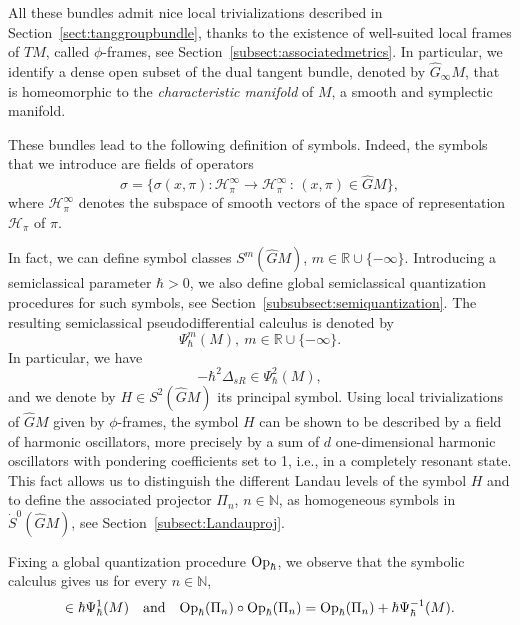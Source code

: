 \documentclass[12pt,a4paper]{amsart}
\theoremstyle{plain}
\theoremstyle{definition}
\theoremstyle{remark}
\numberwithin{equation}{section}
\theoremstyle{definition}
\def\R{{\mathbb R}}%
\def\N{{\mathbb N}}%
\def \Op{{\rm Op}}
\def \Ghat{\widehat{G}}
\numberwithin{equation}{section}
\begin{document}
All these bundles admit nice local trivializations described in Section~\ref{sect:tanggroupbundle}, thanks to the existence of well-suited local frames of $TM$, called $\phi$-frames, see Section~\ref{subsect:associatedmetrics}. In particular, we identify a dense open subset of the dual tangent bundle, denoted by $\Ghat_\infty M$, that is homeomorphic to the \emph{characteristic manifold} of $M$, a smooth and symplectic manifold.

\vspace{0.25cm}

These bundles lead to the following definition of symbols. Indeed, the symbols that we introduce are fields of operators
\begin{equation*}
    \sigma = \{\sigma(x,\pi):\mathcal{H}_\pi^\infty\rightarrow\mathcal{H}_\pi^\infty\,:\,(x,\pi)\in\Ghat M\},
\end{equation*}
where $\mathcal{H}_\pi^\infty$ denotes the subspace of smooth vectors of the space of representation $\mathcal{H}_\pi$ of $\pi$.

In fact, we can define symbol classes $S^m(\Ghat M)$, $m\in\R\cup\{-\infty\}$. Introducing a semiclassical parameter $\hbar>0$, we also define global semiclassical quantization procedures for such symbols, see Section~\ref{subsubsect:semiquantization}. The resulting semiclassical pseudodifferential calculus is denoted by 
\begin{equation*}
    \Psi_\hbar^m(M),\ m\in \R\cup\{-\infty\}.
\end{equation*}
In particular, we have
\begin{equation*}
    -\hbar^2\Delta_{sR} \in \Psi_\hbar^2(M),
\end{equation*}
and we denote by $H\in S^2(\Ghat M)$ its principal symbol. Using local trivializations of $\Ghat M$ given by $\phi$-frames, the symbol $H$ can be shown to be described by a field of harmonic oscillators, more precisely by a sum of $d$ one-dimensional harmonic oscillators with pondering coefficients set to 1, i.e., in a completely resonant state. This fact allows us to distinguish the different Landau levels of the symbol $H$ and to define the associated projector $\Pi_n$, $n\in\N$, as homogeneous symbols in $\dot{S}^0(\Ghat M)$, see Section~\ref{subsect:Landauproj}.

Fixing a global quantization procedure $\Op_\hbar$, we observe that the symbolic calculus gives us for every $n\in\N$,
\begin{equation*}
    [-\hbar^2 \Delta_{\rm sR},\Op_\hbar(\Pi_n)] \in \hbar \Psi_\hbar^{1}(M)\quad\mbox{and}\quad\Op_\hbar(\Pi_n)\circ \Op_\hbar(\Pi_n)=\Op_\hbar(\Pi_n) + \hbar\Psi_\hbar^{-1}(M).
\end{equation*} 
\end{document}
